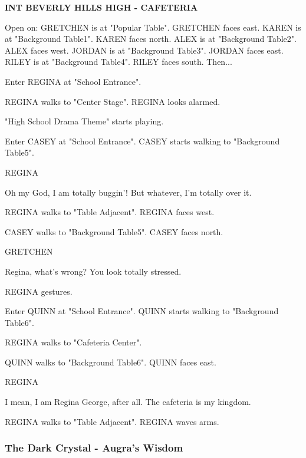 \documentclass[11pt,letterpaper,oldstylefigures]{memoir}
\newcommand{\slugline}[1]{\nobreak\textbf{\MakeUppercase{#1}}\par\nobreak\vspace{1\baselineskip}}
\newcommand{\speaker}[1]{\nobreak\hspace*{0.333\textwidth}\MakeUppercase{#1}\par\nobreak\vspace{0.5\baselineskip}}
\newcommand{\dialogue}[1]{\nobreak\hspace*{0.25\textwidth}\begin{minipage}{0.5\textwidth}#1\end{minipage}\par\vspace{1\baselineskip}}
\newcommand{\stagedir}[1]{#1\par\vspace{1\baselineskip}}
\newenvironment{FountainExample}
  {\begingroup
  \ttfamily\small
   \setlength{\parindent}{0pt}
  \setlength{\parskip}{0.5em}
  \allowdisplaybreaks
  \setlength{\displaywidowpenalty}{0}
  \setlength{\widowpenalty}{0}
  \setlength{\clubpenalty}{0}
  \setlength{\interlinepenalty}{0}
}
  {\endgroup}
\newcommand{\paragraphbreak}{\vspace{0.5em}}
\begin{document}
\begin{FountainExample}
\slugline{INT BEVERLY HILLS HIGH - CAFETERIA}

\stagedir{Open on: GRETCHEN is at "Popular Table". GRETCHEN faces east. KAREN is at "Background Table1". KAREN faces north. ALEX is at "Background Table2". ALEX faces west. JORDAN is at "Background Table3". JORDAN faces east. RILEY is at "Background Table4". RILEY faces south. Then...}
\stagedir{Enter REGINA at "School Entrance".}

\stagedir{REGINA walks to "Center Stage". REGINA looks alarmed.}
\stagedir{"High School Drama Theme" starts playing.}
\stagedir{Enter CASEY at "School Entrance". CASEY starts walking to "Background Table5".}

\speaker{REGINA}
\dialogue{Oh my God, I am totally buggin'! But whatever, I'm totally over it.}

\stagedir{REGINA walks to "Table Adjacent". REGINA faces west.}
\stagedir{CASEY walks to "Background Table5". CASEY faces north.}

\speaker{GRETCHEN}
\dialogue{Regina, what's wrong? You look totally stressed.}

\stagedir{REGINA gestures.}
\stagedir{Enter QUINN at "School Entrance". QUINN starts walking to "Background Table6".}

\stagedir{REGINA walks to "Cafeteria Center".}
\stagedir{QUINN walks to "Background Table6". QUINN faces east.}

\speaker{REGINA}
\dialogue{I mean, I am Regina George, after all. The cafeteria is my kingdom.}

\stagedir{REGINA walks to "Table Adjacent". REGINA waves arms.}
\end{FountainExample}

\paragraphbreak

\subsubsection*{The Dark Crystal - Augra's Wisdom}
\label{ex:dark-crystal-augra}
\end{document}
